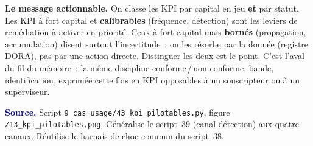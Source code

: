 \documentclass[11pt,a4paper]{article}
\begin{document}
\begin{cle}
\textbf{Le message actionnable.} On classe les KPI par capital en jeu \textbf{et} par statut.
Les KPI à fort capital et \textbf{calibrables} (fréquence, détection) sont les leviers de
remédiation à activer en priorité. Ceux à fort capital mais \textbf{bornés} (propagation,
accumulation) disent surtout l'incertitude~: on les résorbe par la donnée (registre DORA),
pas par une action directe. Distinguer les deux est le point. C'est l'aval du fil du mémoire~:
la même discipline conforme\,/\,non conforme, bande, identification, exprimée cette fois en KPI
opposables à un souscripteur ou à un superviseur.
\end{cle}

\smallskip
\noindent\footnotesize\textcolor{navy}{\textbf{Source.}} Script
\texttt{9\_cas\_usage/43\_kpi\_pilotables.py}, figure \texttt{Z13\_kpi\_pilotables.png}.
Généralise le script~39 (canal détection) aux quatre canaux. Réutilise le harnais de choc
commun du script~38.
\end{document}
